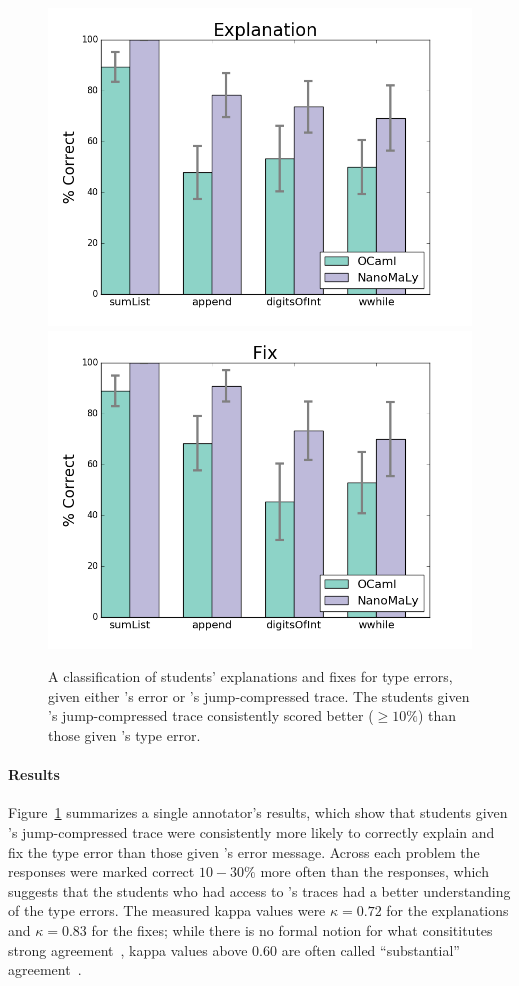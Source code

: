 \begin{figure}[t]
\includegraphics[width=0.7\linewidth]{user-study-reason.png}
\includegraphics[width=0.7\linewidth]{user-study-fix.png}
\caption{A classification of students' explanations and fixes for type
  errors, given either \ocaml's error %
  or \toolname's
  jump-compressed trace. The students given \toolname's jump-compressed
  trace consistently scored better ($\ge 10\%$) than those given \ocaml's type
  error.}
\label{fig:results-user-study}
\end{figure}

\paragraph{Results}
%
Figure~\ref{fig:results-user-study} summarizes a single annotator's
results, which show that students given \toolname's jump-compressed
trace were consistently more likely to correctly explain
and fix the type error than those given \ocaml's error message.
%
Across each problem the \toolname responses were marked correct
$10-30\%$ more often than the \ocaml responses, which suggests that
the students who had access to \toolname's traces had a better
understanding of the type errors.
%
The measured kappa values were $\kappa = 0.72$ for the explanations and
$\kappa = 0.83$ for the fixes; while there is no formal notion for what
consititutes strong agreement~\cite{Krippendorff2012-wd}, kappa values
above $0.60$ are often called ``substantial''
agreement~\cite{Landis1977-ey}.
%
%

